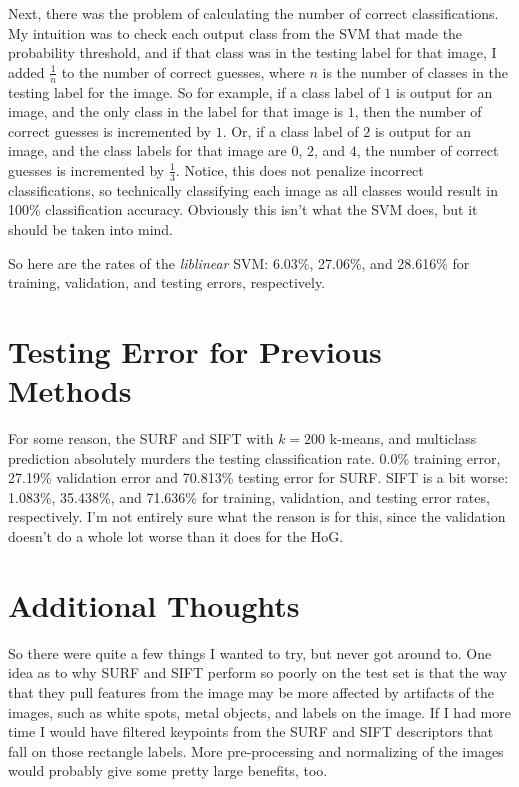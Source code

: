 \documentclass[12pt]{article}
\begin{document}
Next, there was the problem of calculating the number of correct classifications. My
intuition was to check each output class from the SVM that made the probability
threshold, and if that class was in the testing label for that image, I added
$\frac{1}{n}$ to the number of correct guesses, where $n$ is the number of classes in
the testing label for the image. So for example, if a class label of $1$ is output
for an image, and the only class in the label for that image is $1$, then the
number of correct guesses is incremented by $1$. Or, if a class label of $2$ is
output for an image, and the class labels for that image are $0$, $2$, and $4$,
the number of correct guesses is incremented by $\frac{1}{3}$. Notice, this
does not penalize incorrect classifications, so technically classifying each image
as all classes would result in 100\% classification accuracy. Obviously this isn't
what the SVM does, but it should be taken into mind.

So here are the rates of the {\it liblinear} SVM: 6.03\%, 27.06\%, and 28.616\%
for training, validation, and testing errors, respectively.

\section*{Testing Error for Previous Methods}
For some reason, the SURF and SIFT with $k = 200$ k-means, and multiclass
prediction absolutely murders the testing classification rate. 0.0\% training error,
27.19\% validation error and 70.813\% testing error for SURF. SIFT is a bit worse:
1.083\%, 35.438\%, and 71.636\% for training, validation, and testing error rates,
respectively. I'm not entirely sure what the reason is for this, since the validation
doesn't do a whole lot worse than it does for the HoG.

\section*{Additional Thoughts}
So there were quite a few things I wanted to try, but never got around to. One idea
as to why SURF and SIFT perform so poorly on the test set is that the way that they
pull features from the image may be more affected by artifacts of the images, such
as white spots, metal objects, and labels on the image. If I had more time I would
have filtered keypoints from the SURF and SIFT descriptors that fall on those rectangle
labels. More pre-processing and normalizing of the images would probably give some
pretty large benefits, too.
\end{document}
